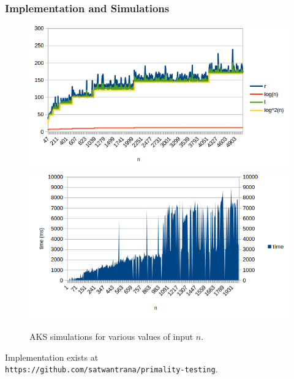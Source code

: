 \documentclass{beamer}
\begin{document}
\begin{frame}
\frametitle{Implementation and Simulations}
\begin{figure}
 \includegraphics[width=\linewidth / 2]{../data/aks/n-r-l-5000.png}
 \includegraphics[width=\linewidth / 2]{../data/aks/n-time-2000.png}
 \caption{AKS simulations for various values of input $n$.}
\end{figure}
Implementation exists at \\\texttt{https://github.com/satwantrana/primality-testing}.
\end{frame}
\end{document}
